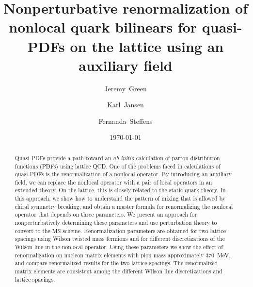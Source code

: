 \documentclass[prl,reprint,notitlepage,nofootinbib]{revtex4-1}
\newcommand{\MSbar}{\overline{\text{MS}}}
\begin{document}
\title{Nonperturbative renormalization of nonlocal quark bilinears for quasi-PDFs on the lattice using an auxiliary field}

\author{Jeremy~Green}
\author{Karl~Jansen}
\author{Fernanda~Steffens}

\date{\today}

\begin{abstract}
  Quasi-PDFs provide a path toward an \emph{ab initio} calculation of
  parton distribution functions (PDFs) using lattice QCD. One of the
  problems faced in calculations of quasi-PDFs is the renormalization
  of a nonlocal operator. By introducing an auxiliary field, we can
  replace the nonlocal operator with a pair of local operators in an
  extended theory. On the lattice, this is closely related to the
  static quark theory. In this approach, we show how to understand the
  pattern of mixing that is allowed by chiral symmetry breaking, and
  obtain a master formula for renormalizing the nonlocal operator that
  depends on three parameters. We present an approach for
  nonperturbatively determining these parameters and use perturbation
  theory to convert to the $\MSbar$ scheme. Renormalization parameters
  are obtained for two lattice spacings using Wilson twisted mass
  fermions and for different discretizations of the Wilson line in the
  nonlocal operator. Using these parameters we show the effect of
  renormalization on nucleon matrix elements with pion mass
  approximately 370~MeV, and compare renormalized results for the two
  lattice spacings. The renormalized matrix elements are consistent
  among the different Wilson line discretizations and lattice
  spacings.
\end{abstract}

\maketitle
\end{document}
